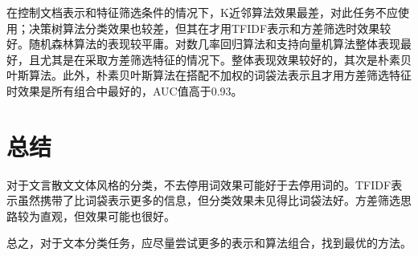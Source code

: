 \documentclass[12pt, a4paper, oneside]{ctexart}
\begin{document}
在控制文档表示和特征筛选条件的情况下，K近邻算法效果最差，对此任务不应使用；决策树算法分类效果也较差，但其在才用TFIDF表示和方差筛选时效果较好。随机森林算法的表现较平庸。对数几率回归算法和支持向量机算法整体表现最好，且尤其是在采取方差筛选特征的情况下。整体表现效果较好的，其次是朴素贝叶斯算法。此外，朴素贝叶斯算法在搭配不加权的词袋法表示且才用方差筛选特征时效果是所有组合中最好的，AUC值高于0.93。

\section{总结}

对于文言散文文体风格的分类，不去停用词效果可能好于去停用词的。TFIDF表示虽然携带了比词袋表示更多的信息，但分类效果未见得比词袋法好。方差筛选思路较为直观，但效果可能也很好。

总之，对于文本分类任务，应尽量尝试更多的表示和算法组合，找到最优的方法。
\end{document}
